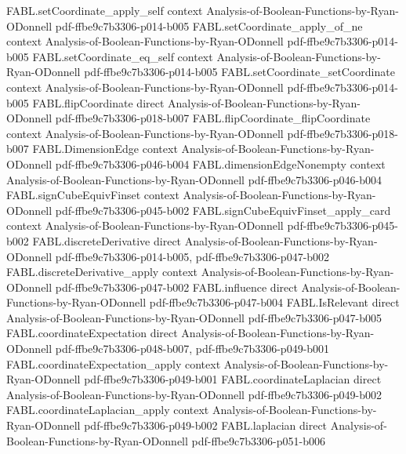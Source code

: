 \begin{theorem}
\proofstep
  {FABL.setCoordinate_apply_self}
  {context}
  {Analysis-of-Boolean-Functions-by-Ryan-ODonnell}
  {pdf-ffbe9c7b3306-p014-b005}
\proofstep
  {FABL.setCoordinate_apply_of_ne}
  {context}
  {Analysis-of-Boolean-Functions-by-Ryan-ODonnell}
  {pdf-ffbe9c7b3306-p014-b005}
\proofstep
  {FABL.setCoordinate_eq_self}
  {context}
  {Analysis-of-Boolean-Functions-by-Ryan-ODonnell}
  {pdf-ffbe9c7b3306-p014-b005}
\proofstep
  {FABL.setCoordinate_setCoordinate}
  {context}
  {Analysis-of-Boolean-Functions-by-Ryan-ODonnell}
  {pdf-ffbe9c7b3306-p014-b005}
\proofstep
  {FABL.flipCoordinate}
  {direct}
  {Analysis-of-Boolean-Functions-by-Ryan-ODonnell}
  {pdf-ffbe9c7b3306-p018-b007}
\proofstep
  {FABL.flipCoordinate_flipCoordinate}
  {context}
  {Analysis-of-Boolean-Functions-by-Ryan-ODonnell}
  {pdf-ffbe9c7b3306-p018-b007}
\proofstep
  {FABL.DimensionEdge}
  {context}
  {Analysis-of-Boolean-Functions-by-Ryan-ODonnell}
  {pdf-ffbe9c7b3306-p046-b004}
\proofstep
  {FABL.dimensionEdgeNonempty}
  {context}
  {Analysis-of-Boolean-Functions-by-Ryan-ODonnell}
  {pdf-ffbe9c7b3306-p046-b004}
\proofstep
  {FABL.signCubeEquivFinset}
  {context}
  {Analysis-of-Boolean-Functions-by-Ryan-ODonnell}
  {pdf-ffbe9c7b3306-p045-b002}
\proofstep
  {FABL.signCubeEquivFinset_apply_card}
  {context}
  {Analysis-of-Boolean-Functions-by-Ryan-ODonnell}
  {pdf-ffbe9c7b3306-p045-b002}
\proofstep
  {FABL.discreteDerivative}
  {direct}
  {Analysis-of-Boolean-Functions-by-Ryan-ODonnell}
  {pdf-ffbe9c7b3306-p014-b005,
    pdf-ffbe9c7b3306-p047-b002}
\proofstep
  {FABL.discreteDerivative_apply}
  {context}
  {Analysis-of-Boolean-Functions-by-Ryan-ODonnell}
  {pdf-ffbe9c7b3306-p047-b002}
\proofstep
  {FABL.influence}
  {direct}
  {Analysis-of-Boolean-Functions-by-Ryan-ODonnell}
  {pdf-ffbe9c7b3306-p047-b004}
\proofstep
  {FABL.IsRelevant}
  {direct}
  {Analysis-of-Boolean-Functions-by-Ryan-ODonnell}
  {pdf-ffbe9c7b3306-p047-b005}
\proofstep
  {FABL.coordinateExpectation}
  {direct}
  {Analysis-of-Boolean-Functions-by-Ryan-ODonnell}
  {pdf-ffbe9c7b3306-p048-b007,
    pdf-ffbe9c7b3306-p049-b001}
\proofstep
  {FABL.coordinateExpectation_apply}
  {context}
  {Analysis-of-Boolean-Functions-by-Ryan-ODonnell}
  {pdf-ffbe9c7b3306-p049-b001}
\proofstep
  {FABL.coordinateLaplacian}
  {direct}
  {Analysis-of-Boolean-Functions-by-Ryan-ODonnell}
  {pdf-ffbe9c7b3306-p049-b002}
\proofstep
  {FABL.coordinateLaplacian_apply}
  {context}
  {Analysis-of-Boolean-Functions-by-Ryan-ODonnell}
  {pdf-ffbe9c7b3306-p049-b002}
\proofstep
  {FABL.laplacian}
  {direct}
  {Analysis-of-Boolean-Functions-by-Ryan-ODonnell}
  {pdf-ffbe9c7b3306-p051-b006}

\end{theorem}
